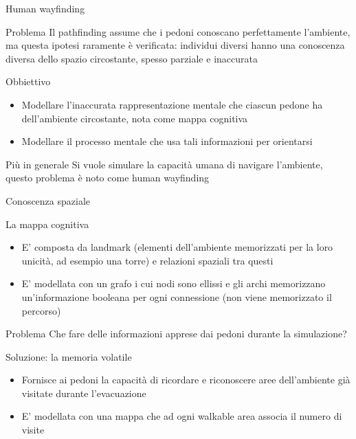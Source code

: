 \documentclass{beamer}
\begin{document}
\begin{frame}{Human wayfinding}
\begin{alertblock}{Problema}
Il pathfinding assume che i pedoni conoscano perfettamente l'ambiente, ma questa ipotesi raramente è verificata: individui diversi hanno una \textcolor{bostonuniversityred}{conoscenza diversa} dello spazio circostante, spesso \textcolor{bostonuniversityred}{parziale} e \textcolor{bostonuniversityred}{inaccurata}
\end{alertblock}
\begin{block}{Obbiettivo}
\begin{itemize}
    \item Modellare l'inaccurata rappresentazione mentale che ciascun pedone ha dell’ambiente circostante, nota come \textcolor{bostonuniversityred}{mappa cognitiva}
    \item Modellare il processo mentale che usa tali informazioni per orientarsi
\end{itemize}
\end{block}
\begin{block}{Più in generale}
Si vuole simulare la capacità umana di navigare l'ambiente, questo problema è noto come human wayfinding
\end{block}
\end{frame}

\begin{frame}{Conoscenza spaziale}
\begin{block}{La mappa cognitiva}
\begin{itemize}
    \item E' composta da \textcolor{bostonuniversityred}{landmark} (elementi dell'ambiente memorizzati per la loro unicità, ad esempio una torre) e relazioni spaziali tra questi
    \item E' modellata con un grafo i cui nodi sono \textcolor{bostonuniversityred}{ellissi} e gli archi memorizzano un'informazione booleana per ogni connessione (non viene memorizzato il percorso)
\end{itemize}
\end{block}
\begin{alertblock}{Problema}
Che fare delle informazioni apprese dai pedoni durante la simulazione?
\end{alertblock}
\begin{block}{Soluzione: la memoria volatile}
\begin{itemize}
    \item Fornisce ai pedoni la capacità di ricordare e riconoscere aree dell'ambiente già visitate durante l'evacuazione
    \item E' modellata con una mappa che ad ogni walkable area associa il numero di visite
\end{itemize}{}
\end{block}{}

\end{frame}{}
\end{document}
